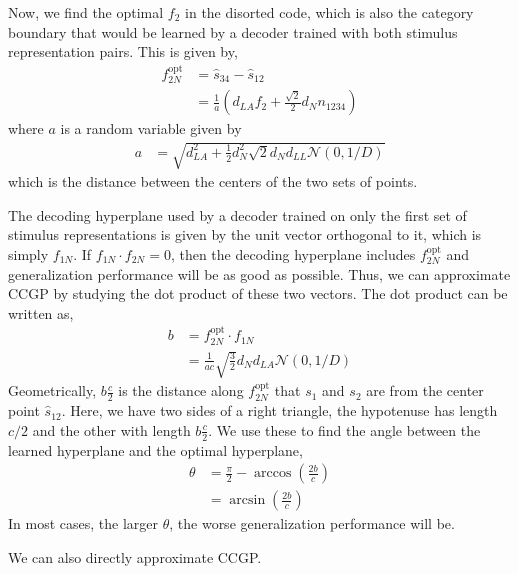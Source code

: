 \documentclass[letter,12pt]{article}
\newcommand{\dll}{d_{LL}}
\newcommand{\dla}{d_{LA}}
\newcommand{\dn}{d_{N}}
\newcommand{\dis}{\mathcal{N}(0, 1/D)}
\newcommand{\fno}{f_{2N}^{\text{opt}}}
\begin{document}
Now, we find the optimal $f_{2}$ in the disorted code, which is also the category
boundary that would be learned by a decoder trained with both stimulus
representation pairs. This is given by,
\begin{align}
  f_{2N}^{\text{opt}} &= \hat{s}_{34} - \hat{s}_{12} \\
  &= \frac{1}{a}\left(\dla f_{2} + \frac{\sqrt{2}}{2} \dn n_{1234}\right)
\end{align}
where $a$ is a random variable given by
\begin{align}
  a &= \sqrt{\dla^{2} + \frac{1}{2}\dn^{2} \sqrt{2}\dn \dll \dis}
\end{align}
which is the distance between the centers of the two sets of points.

The decoding hyperplane used by a decoder trained on only the first set of
stimulus representations is given by the unit vector orthogonal to it, which is
simply $f_{1N}$. If $f_{1N} \cdot f_{2N} = 0$, then the decoding hyperplane
includes $f_{2N}^{\text{opt}}$ and generalization performance will be as good as
possible. Thus, we can approximate CCGP by studying the dot product of these
two vectors. The dot product can be written as,
\begin{align}
  b &= f_{2N}^{\text{opt}} \cdot f_{1N} \\
  &= \frac{1}{ac} \sqrt{\frac{3}{2}} \dn \dla \dis
\end{align}
Geometrically, $b \frac{c}{2}$ is the distance along $\fno$ that $s_{1}$ and
$s_{2}$ are from the center point $\hat{s}_{12}$. Here, we have two sides of a
right triangle, the hypotenuse has length $c/2$ and the other with length
$b \frac{c}{2}$. We use these to find the angle between the learned hyperplane
and the optimal hyperplane,
\begin{align}
  \theta &= \frac{\pi}{2} - \arccos\left(\frac{2b}{c}\right) \\
  &= \arcsin\left(\frac{2b}{c}\right)
\end{align}
In most cases, the larger $\theta$, the worse generalization performance will
be.

We can also directly approximate CCGP. 
\end{document}
